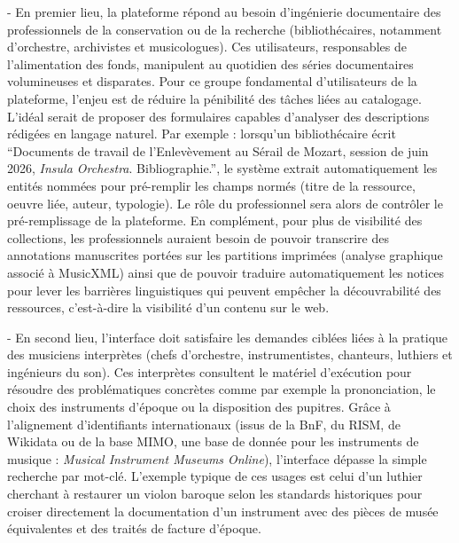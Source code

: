 - En premier lieu, la plateforme répond au besoin d'ingénierie documentaire des professionnels de la conservation ou de la recherche (bibliothécaires, notamment d'orchestre, archivistes et musicologues). Ces utilisateurs, responsables de l'alimentation des fonds, manipulent au quotidien des séries documentaires volumineuses et disparates. 
Pour ce groupe fondamental d'utilisateurs de la plateforme, l'enjeu est de réduire la pénibilité des tâches liées au catalogage. L'idéal serait de proposer des formulaires capables d'analyser des descriptions rédigées en langage naturel. Par exemple : lorsqu'un bibliothécaire écrit \enquote{Documents de travail de l'Enlevèvement au Sérail de Mozart, session de juin 2026, \textit{Insula Orchestra}. Bibliographie.}, le système extrait automatiquement les entités nommées pour pré-remplir les champs normés (titre de la ressource, oeuvre liée, auteur, typologie). Le rôle du professionnel sera alors de contrôler le pré-remplissage de la plateforme. 
En complément, pour plus de visibilité des collections, les professionnels auraient besoin de pouvoir transcrire des annotations manuscrites portées sur les partitions imprimées (analyse graphique associé à MusicXML) ainsi que de pouvoir traduire automatiquement les notices pour lever les barrières linguistiques qui peuvent empêcher la découvrabilité des ressources, c'est-à-dire la visibilité d'un contenu sur le web.

- En second lieu, l'interface doit satisfaire les demandes ciblées liées à la pratique des musiciens interprètes (chefs d'orchestre, instrumentistes, chanteurs, luthiers et ingénieurs du son). Ces interprètes consultent le matériel d'exécution pour résoudre des problématiques concrètes comme par exemple la prononciation, le choix des instruments d'époque ou la disposition des pupitres. Grâce à l'alignement d'identifiants internationaux (issus de la BnF, du RISM, de Wikidata ou de la base MIMO, une base de donnée pour les instruments de musique : \textit{Musical Instrument Museums Online}), l'interface dépasse la simple recherche par mot-clé. L'exemple typique de ces usages est celui d'un luthier cherchant à restaurer un violon baroque selon les standards historiques pour croiser directement la documentation d'un instrument avec des pièces de musée équivalentes et des traités de facture d'époque.


